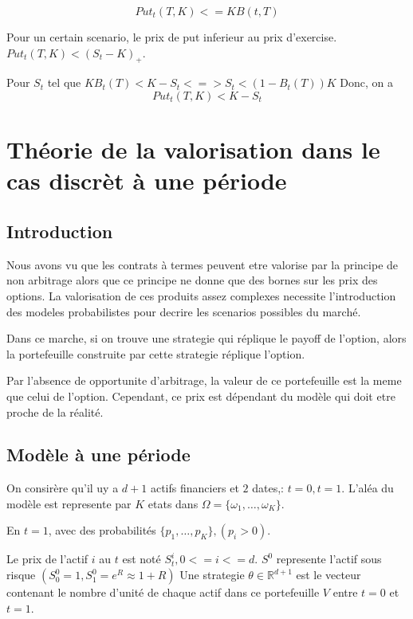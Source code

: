 \documentclass{article}
\begin{document}
\begin{equation}
Put_t(T, K) <= KB(t, T)
\end{equation}

Pour un certain scenario, le prix de put inferieur au prix d'exercise. $Put_t(T, K)<(S_t-K)_+$.

Pour $S_t$ tel que $KB_t(T)< K-S_t <=> S_t < (1-B_t(T))K$
Donc, on a
\begin{equation}
Put_t(T, K)< K-S_t
\end{equation} 

\section{Th\'eorie de la valorisation dans le cas discr\`et \`a une p\'eriode}

\subsection{Introduction}
Nous avons vu que les contrats \`a termes peuvent etre valorise par la principe de non arbitrage alors que ce principe ne donne que des bornes sur les prix des options. La valorisation de ces produits assez complexes necessite l'introduction des modeles probabilistes pour decrire les scenarios possibles du march\'e.

Dans ce marche, si on trouve une strategie qui r\'eplique le payoff de l'option, alors la portefeuille construite par cette strategie r\'eplique l'option.

Par l'absence de opportunite d'arbitrage, la valeur de ce portefeuille est la meme que celui de l'option. Cependant, ce prix est d\'ependant du mod\`ele qui doit etre proche de la r\'ealit\'e.

\subsection{Mod\`ele \`a une p\'eriode}

On consir\`ere qu'il uy a $d+1$ actifs financiers et $2$ dates,: $t=0, t=1$. L'al\'ea du mod\`ele est represente par $K$ etats dans $\Omega=\{\omega_1,\ldots,\omega_K\}$.

En $t=1$, avec des probabilit\'es $ \{p_1,\ldots,p_K\},(p_i>0) $.

Le prix de l'actif $i$ au $t$ est not\'e $S_t^i, 0<=i<=d$. $S^0$ represente l'actif sous risque $(S_0^0=1, S_1^0=e^R\approx 1+R)$
Une strategie $\theta\in\mathbb{R}^{d+1}$ est le vecteur contenant le nombre d'unit\'e de chaque actif dans ce portefeuille $V$ entre $t=0$ et $t=1$. 
\end{document}

